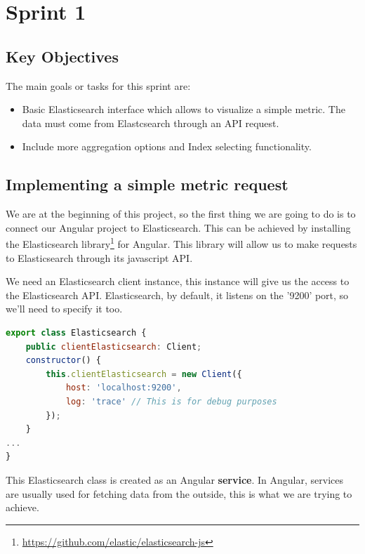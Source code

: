 \documentclass[a4paper, 12pt, english]{book}
\begin{document}
\section{Sprint 1}
\label{sec:sprint-1}

\subsection{Key Objectives}
\label{sec:key-objectives}

The main goals or tasks for this sprint are:
\begin{itemize}
    \item Basic Elasticsearch interface which allows to visualize a simple metric. The data must come from Elastcsearch through an API request.
    \item Include more aggregation options and Index selecting functionality.
\end{itemize}

\subsection{Implementing a simple metric request}
\label{sec:simple-request}
We are at the beginning of this project, so the first thing we are going to do is to connect our Angular project to Elasticsearch. This can be achieved by installing the Elasticsearch library\footnote{\url{https://github.com/elastic/elasticsearch-js}} for Angular. This library will allow us to make requests to Elasticsearch through its javascript API.

We need an Elasticsearch client instance, this instance will give us the access to the Elasticsearch API. Elasticsearch, by default, it listens on the '9200' port, so we'll need to specify it too.
\begin{lstlisting}[language=javascript, caption=Client Instance, label=code:client-instance]
export class Elasticsearch {
	public clientElasticsearch: Client;
	constructor() {
		this.clientElasticsearch = new Client({
			host: 'localhost:9200',
			log: 'trace' // This is for debug purposes
		});
	}
...
}
\end{lstlisting}
This Elasticsearch class is created as an Angular \textbf{service}. In Angular, services are usually used for fetching data from the outside, this is what we are trying to achieve.
\end{document}
